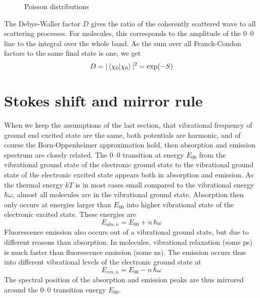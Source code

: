 \begin{figure}
   
  \caption{Poisson distributions}
\end{figure}

The Debye-Waller factor $D$ gives the ratio of the coherently scattered wave to all scattering processes. For molecules, this corresponds to the amplitude of the 0--0 line to the integral over the whole band. As the sum over all Franck-Condon factors to the same final state is one, we get
\[
 D =  | \braket{ \chi_0 | \chi_0 } | ^2 = \exp(-S)
\]


\section{Stokes shift and mirror rule}


When we keep the assumptions of the last section, that vibrational frequency of ground end excited state are the same, both potentials are harmonic, and of course the Born-Oppenheimer approximation hold, then absorption and emission spectrum are closely related. The 0--0 transition at energy $E_{00}$ from the vibrational ground state of the electronic ground state to the vibrational ground state of the electronic excited state appears both in absorption and emission. As the thermal energy $kT$ is in most cases small compared to the vibrational energy $\hbar \omega$, almost all molecules are in the vibrational ground state. Absorption then only occurs at energies larger than $E_{00}$ into higher vibrational state of the electronic excited state. These energies are
\[
  E_{abs, n} = E_{00} + n \, \hbar \omega
\]
Fluorescence emission also occurs out of a vibrational ground state, but due to different reasons than absorption. In molecules, vibrational relaxation  (some ps) is much faster than fluorescence emission (some ns). The emission occurs thus into different vibrational levels of the electronic ground state at
\[
  E_{em, n} = E_{00} - n \, \hbar \omega
\]
The spectral position of the absorption and emission peaks are thus mirrored around the 0--0 transition  energy $E_{00}$.

